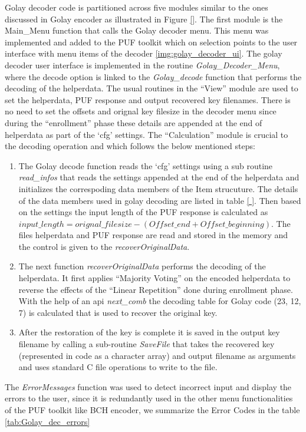 Golay decoder code is partitioned across five modules similar to the ones discussed in Golay encoder as illustrated in Figure \ref{}. The first module is the Main\_Menu function that calls the Golay decoder menu. This menu was implemented and added to the PUF toolkit which on selection points to the user interface with menu items of the decoder \ref{img:golay_decoder_ui}. The golay decoder user interface is implemented in the routine \emph{Golay\_Decoder\_Menu}, where the decode option is linked to the \emph{Golay\_decode}
function that performs the decoding of the helperdata. The usual routines in the ``View'' module are used to set the helperdata, PUF response and output recovered key filenames. There is no need to set the offsets and orignal key filesize in the decoder menu since during the ``enrollment'' phase these details are appended at the end of helperdata as part of the `cfg' settings. The ``Calculation'' module is crucial to the decoding operation and which follows the below mentioned
steps:
\begin{enumerate}
	\item The Golay decode function reads the `cfg' settings using a sub routine \emph{read\_infos} that reads the settings appended at the end of the helperdata and initializes the correspoding data members of the Item strucuture. The details of the data members used in golay decoding are listed in table \ref{ }. Then based on the settings the input length of the PUF response is calculated as $input\_length = orignal\_filesize - (Offset\_end + Offset\_beginning)$. The files
		helperdata and PUF response are read and stored in the memory and the control is given to the \emph{recoverOriginalData}.
	\item The next function \emph{recoverOriginalData} performs the decoding of the helperdata. It first applies ``Majority Voting'' on the encoded helperdata to reverse the effects of the ``Linear Repetition'' done during enrollment phase. With the help of an api \emph{next\_comb} the decoding table for Golay code (23, 12, 7) is calculated that is used to recover the original key.
	\item After the restoration of the key is complete it is saved in the output key filename by calling a
		sub-routine \emph{SaveFile} that takes the recovered key (represented in code as a character array) and output filename as arguments and uses standard C file operations to write to the file.
\end{enumerate}

The \emph{ErrorMessages} function was used to detect incorrect input and display the errors to the user, since it is redundantly used in the other menu functionalities of the PUF toolkit like BCH encoder, we summarize the Error Codes in the table \ref{tab:Golay_dec_errors}

